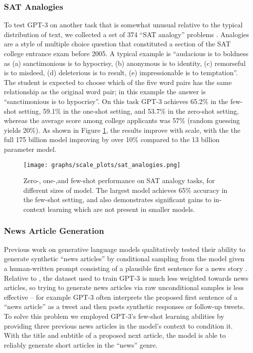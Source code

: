 \documentclass{article}
\begin{document}
        \subsubsection{SAT Analogies}
        \label{section:SAT_Analogies}
        To test GPT-3 on another task that is somewhat unusual relative to the typical distribution of text, we collected a set of 374 ``SAT analogy'' problems \cite{DBLP:journals/corr/cs-CL-0309035}.  Analogies are a style of multiple choice question that constituted a section of the SAT college entrance exam before 2005.  A typical example is ``audacious is to boldness as (a) sanctimonious is to hypocrisy, (b) anonymous is to identity, (c) remorseful is to misdeed, (d) deleterious is to result, (e) impressionable is to temptation''.  The student is expected to choose which of the five word pairs has the same relationship as the original word pair; in this example the answer is ``sanctimonious is to hypocrisy''.  On this task GPT-3 achieves 65.2\% in the few-shot setting, 59.1\% in the one-shot setting, and 53.7\% in the zero-shot setting, whereas the average score among college applicants was 57\% \cite{DBLP:journals/corr/abs-cs-0508103}  (random guessing yields 20\%).  As shown in Figure \ref{graph:sat}, the results improve with scale, with the the full 175 billion model improving by over 10\% compared to the 13 billion parameter model.

\begin{figure}
\centering\texttt{[image: graphs/scale\_plots/sat\_analogies.png]}
\caption{Zero-, one-,and few-shot performance on SAT analogy tasks, for different sizes of model.  The largest model achieves 65\% accuracy in the few-shot setting, and also demonstrates significant gains to in-context learning which are not present in smaller models.}
\label{graph:sat}
\end{figure}          
        \subsubsection{News Article Generation}
        \label{section:News_Article_Generation}
        Previous work on generative language models qualitatively tested their ability to generate synthetic ``news articles'' by conditional sampling from the model given a human-written prompt consisting of a plausible first sentence for a news story \cite{radford2019language}.  Relative to \cite{radford2019language}, the dataset used to train GPT-3 is much less weighted towards news articles, so trying to generate news articles via raw unconditional samples is less effective -- for example GPT-3 often interprets the proposed first sentence of a ``news article'' as a tweet and then posts synthetic responses or follow-up tweets.  To solve this problem we employed GPT-3’s few-shot learning abilities by providing three previous news articles in the model’s context to condition it.  With the title and subtitle of a proposed next article, the model is able to reliably generate short articles in the ``news'' genre.
\end{document}
